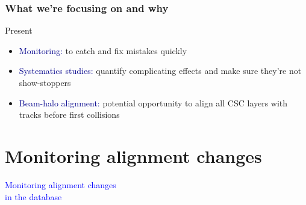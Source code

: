 \documentclass[compress]{beamer}
\begin{document}
\begin{frame}
\frametitle{What we're focusing on and why}
Present
\begin{itemize}\setlength{\itemsep}{0.2 cm}
\item \textcolor{darkblue}{Monitoring:} to catch and fix mistakes quickly
\item \textcolor{darkblue}{Systematics studies:} quantify complicating effects and make sure
they're not show-stoppers
\item \textcolor{darkblue}{Beam-halo alignment:} potential opportunity to align all CSC
layers with tracks before first collisions
\end{itemize}

\end{frame}

\section*{Monitoring alignment changes}

\begin{frame}
\begin{center}
\Huge \textcolor{blue}{Monitoring alignment changes \\ in the database}
\end{center}
\end{frame}
\end{document}
